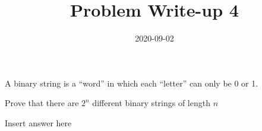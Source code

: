 \documentclass[12pt,a4paper]{article}
\title{Problem Write-up 4}
\date{2020-09-02}
\begin{document}
    \begin{problem}
        A binary string is a “word” in which each “letter” can only be 0 or 1.

        Prove that there are \(2^n\) different binary strings of length \(n\)
    \end{problem}
    
    \begin{answer}
        Insert answer here
    \end{answer}
\end{document}
